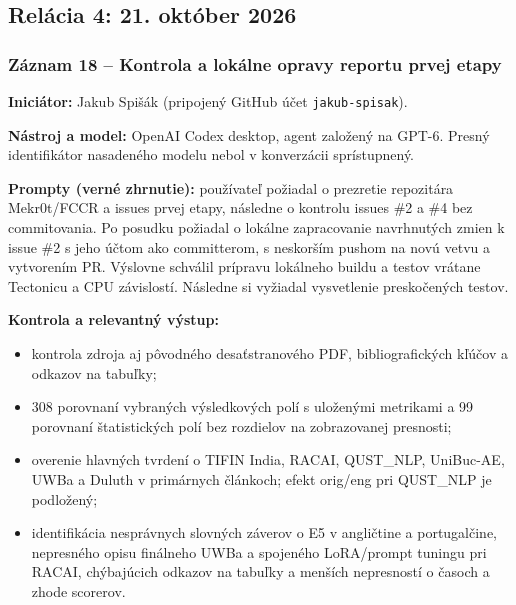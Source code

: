 \subsection*{Relácia 4: 21. október 2026}

\subsubsection*{Záznam 18 -- Kontrola a lokálne opravy reportu prvej etapy}


\par\noindent \textbf{Iniciátor:} Jakub Spišák (pripojený GitHub účet \texttt{jakub-\allowbreak{}spisak}).\par\smallskip
\par\noindent \textbf{Nástroj a model:} OpenAI Codex desktop, agent založený na GPT-6. Presný identifikátor nasadeného modelu nebol v konverzácii sprístupnený.\par\smallskip
\par\noindent \textbf{Prompty (verné zhrnutie):} používateľ požiadal o prezretie repozitára Mekr0t/FCCR a issues prvej etapy, následne o kontrolu issues \#2 a \#4 bez commitovania. Po posudku požiadal o lokálne zapracovanie navrhnutých zmien k issue \#2 s jeho účtom ako committerom, s neskorším pushom na novú vetvu a vytvorením PR. Výslovne schválil prípravu lokálneho buildu a testov vrátane Tectonicu a CPU závislostí. Následne si vyžiadal vysvetlenie preskočených testov.\par\smallskip
\par\noindent \textbf{Kontrola a relevantný výstup:}\par\smallskip
\begin{itemize}\setlength{\itemsep}{1pt}\setlength{\topsep}{2pt}
\item kontrola zdroja aj pôvodného desaťstranového PDF, bibliografických kľúčov a odkazov na tabuľky;
\item 308 porovnaní vybraných výsledkových polí s uloženými metrikami a 99 porovnaní štatistických polí bez rozdielov na zobrazovanej presnosti;
\item overenie hlavných tvrdení o TIFIN India, RACAI, QUST\_NLP, UniBuc-AE, UWBa a Duluth v primárnych článkoch; efekt orig/eng pri QUST\_NLP je podložený;
\item identifikácia nesprávnych slovných záverov o E5 v angličtine a portugalčine, nepresného opisu finálneho UWBa a spojeného LoRA/prompt tuningu pri RACAI, chýbajúcich odkazov na tabuľky a menších nepresností o časoch a zhode scorerov.
\end{itemize}
